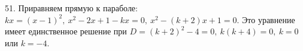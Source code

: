 51. Приравняем прямую к параболе: $kx=(x-1)^2,\ x^2-2x+1-kx=0,\ x^2-(k+2)x+1=0.$ Это уравнение имеет единственное решение при $D=(k+2)^2-4=0,\ k(k+4)=0,\ k=0$ или $k=-4.$\\
